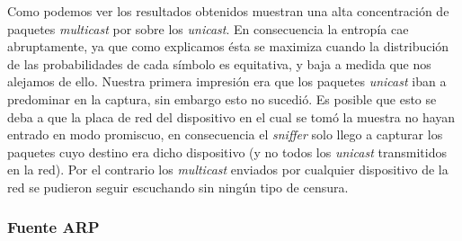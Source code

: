 Como podemos ver los resultados obtenidos muestran una alta concentración de
paquetes \textit{multicast} por sobre los \textit{unicast}. En consecuencia la
entropía cae abruptamente, ya que como explicamos ésta se maximiza cuando la
distribución de las probabilidades de cada símbolo es equitativa, y baja a
medida que nos alejamos de ello. Nuestra primera impresión era que los
paquetes \textit{unicast} iban a predominar en la captura, sin embargo esto no
sucedió. Es posible que esto se deba a que la placa de red del dispositivo en
el cual se tomó la muestra no hayan entrado en modo promiscuo, en consecuencia
el \textit{sniffer} solo llego a capturar los paquetes cuyo destino era dicho
dispositivo (y no todos los \textit{unicast} transmitidos en la red). Por el
contrario los \textit{multicast} enviados por cualquier dispositivo de la red
se pudieron seguir escuchando sin ningún tipo de censura.

\subsubsection{Fuente ARP}

\begin{figure}
	\begin{minipage}[b]{0.9\linewidth}
	\end{minipage}
\end{figure}

